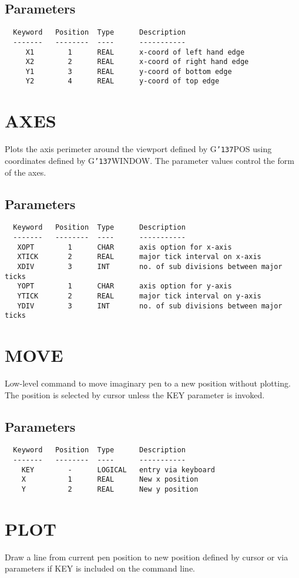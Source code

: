 \documentclass{book}
\renewcommand{\_}{{\tt\char'137}}     %
\begin{document}
\subsection{Parameters}
\begin{verbatim}
  Keyword   Position  Type      Description
  -------   --------  ----      -----------
     X1        1      REAL      x-coord of left hand edge
     X2        2      REAL      x-coord of right hand edge
     Y1        3      REAL      y-coord of bottom edge
     Y2        4      REAL      y-coord of top edge

\end{verbatim}\section{AXES}
Plots the axis perimeter around the viewport defined by G\_POS
using coordinates defined by G\_WINDOW. The parameter values
control the form of the axes.

\subsection{Parameters}
\begin{verbatim}
  Keyword   Position  Type      Description
  -------   --------  ----      -----------
   XOPT        1      CHAR      axis option for x-axis
   XTICK       2      REAL      major tick interval on x-axis
   XDIV        3      INT       no. of sub divisions between major ticks
   YOPT        1      CHAR      axis option for y-axis
   YTICK       2      REAL      major tick interval on y-axis
   YDIV        3      INT       no. of sub divisions between major ticks

\end{verbatim}\section{MOVE}
Low-level command to move imaginary pen to a new position without
plotting. The position is selected by cursor unless the KEY
parameter is invoked.

\subsection{Parameters}
\begin{verbatim}
  Keyword   Position  Type      Description
  -------   --------  ----      -----------
    KEY        -      LOGICAL   entry via keyboard
    X          1      REAL      New x position
    Y          2      REAL      New y position

\end{verbatim}\section{PLOT}
Draw a line from current pen position to new position defined
by cursor or via parameters if KEY is included on the command
line.
\end{document}
